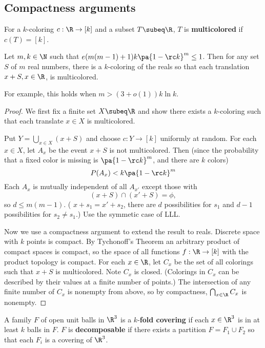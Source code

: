 \subsection{Compactness arguments}
For a $k$-coloring $c:\R\to [k]$ and a subset $T\subeq \R$, $T$ is \textbf{multicolored} if $c(T)=[k]$.
\begin{thm}
Let $m,k\in \N$ such that $e(m(m-1)+1)k\pa{1-\rc k}^m\le 1$. Then for any set $S$ of $m$ real numbers, there is a $k$-coloring of the reals so that each translation $x+S,x\in \R$, is multicolored.
\end{thm}
For example, this holds when $m>(3+o(1))k\ln k$.
\begin{proof}
We first fix a finite set $X\subeq \R$ and show there exists a $k$-coloring such that each translate $x\in X$ is multicolored.

Put $Y=\bigcup_{x\in X}(x+S)$ and choose $c:Y\to [k]$ uniformly at random. For each $x\in X$, let $A_x$ be the event $x+S$ is not multicolored. Then (since the probability that a fixed color is missing is $\pa{1-\rc k}^m$, and there are $k$ colors)
\[
P(A_x)< k\pa{1-\rc k}^m
\]
Each $A_x$ is mutually independent of all $A_{x'}$ except those with
\[
(x+S)\cap (x'+S)=\phi
,\]
so
$d\leq  m(m-1)$.
(%
$x+s_1=x'+s_2$, there are $d$ possibilities for $s_1$ and $d-1$ possibilities for $s_2\neq s_1$.)
Use the symmetic case of LLL.

Now we use a compactness argument to extend the result to reals. Discrete space with $k$ points is compact. By Tychonoff's Theorem an arbitrary product of compact spaces is compact, so the space of all functions $f:\R\to [k]$ with the product topology is compact. For each $x\in \R$, let $C_x$ be the set of all colorings such that $x+S$ is multicolored. Note $C_x$ is closed. (Colorings in $C_x$ can be described by their values at a finite number of points.) The intersection of any finite number of $C_x$ is nonempty from above, so by compactness, $\bigcap_{x\in \R}C_x$ is nonempty.
\end{proof}
\begin{df}
A family $F$ of open unit balls in $\R^3$ is a $k$-\textbf{fold covering} if each $x\in \R^3$ is in at least $k$ balls in $F$. $F$ is \textbf{decomposable} if there exists a partition $F=F_1\cup F_2$ so that each $F_i$ is a covering of $\R^3$.
\end{df}

